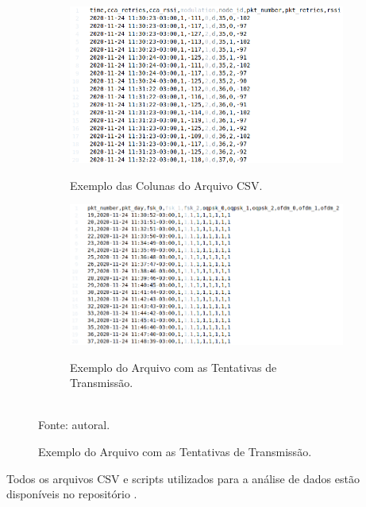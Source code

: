 \begin{figure}[H]
      \centering
      \caption{Dados do experimento.}
      \begin{subfigure}{.45\textwidth}
            \centering
            \caption{Exemplo das Colunas do Arquivo CSV.}
            \includegraphics[width=\textwidth]{./sections/textual/chapters/images/csv_example.png}
            \label{fig:csv_example}
      \end{subfigure}
      \begin{subfigure}{.45\textwidth}
            \centering
            \caption{Exemplo do Arquivo com as Tentativas de Transmissão.}
            \includegraphics[width=\textwidth]{./sections/textual/chapters/images/second_csv_example.png}
            \label{fig:second_csv_example}
      \end{subfigure}
      \\Fonte: autoral.
      \label{fig:camposCSV}
\end{figure}

Todos os arquivos CSV e scripts utilizados para a análise de dados estão disponíveis no repositório \cite{wisun-traces}.

